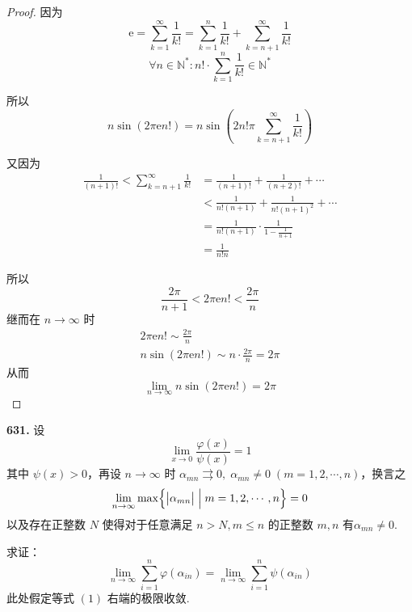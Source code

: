 \begin{proof}
    因为
    \[\mathrm{e} = \sum_{k=1}^{\infty} \frac{1}{k!} = \sum_{k=1}^{n} \frac{1}{k!} + \sum_{k=n+1}^{\infty} \frac{1}{k!}\]
    \[\forall n \in \mathbb{N}^*: n! \cdot \sum_{k=1}^{n} \frac{1}{k!} \in \mathbb{N}^*\]

    所以
    \[n \sin (2\pi \mathrm{e} n!) = n \sin \left(2n! \pi \sum_{k=n+1}^{\infty} \frac{1}{k!}\right)\]

    又因为
    \begin{align*}
        \frac{1}{(n+1)!} < \sum_{k=n+1}^{\infty} \frac{1}{k!} &= \frac{1}{(n+1)!} + \frac{1}{(n+2)!} + \cdots\\
        &< \frac{1}{n!(n+1)} + \frac{1}{n!(n+1)^2} + \cdots\\
        &= \frac{1}{n!(n+1)} \cdot \frac{1}{1-\frac{1}{n+1}}\\
        &= \frac{1}{n!n}
    \end{align*}

    所以
    \[\frac{2\pi}{n+1} < 2\pi \mathrm{e} n! < \frac{2\pi}{n}\]
    继而在 $n \rightarrow \infty$ 时
    \begin{gather*}
        2\pi \mathrm{e} n! \sim \frac{2\pi}{n}\\
        n \sin(2\pi \mathrm{e} n!) \sim n \cdot \frac{2\pi}{n} = 2\pi
    \end{gather*}
    从而
    \[\lim_{n \rightarrow \infty} n \sin(2\pi \mathrm{e} n!) = 2\pi\]
\end{proof}\vspace{9pt}

\textbf{631.} 设
\[\lim_{x \rightarrow 0} \frac{\varphi(x)}{\psi(x)} = 1\]
其中 $\psi(x) > 0$，再设 $n \rightarrow \infty$ 时 $\alpha_{mn} \rightrightarrows 0,\; \alpha_{mn} \neq 0 \;(m = 1,2, \cdots, n)$，换言之
\[\lim_{n \rightarrow \infty} \max\Bigl\{ \bigl| \alpha_{mn}\bigr| \Bigm| m = 1,2,\cdots, n\Bigr\} = 0\]
以及存在正整数 $N$ 使得对于任意满足 $n > N, m \leqslant n$ 的正整数 $m,n$ 有$\alpha_{mn} \neq 0$.

求证：
\[\lim_{n \rightarrow \infty} \sum_{i=1}^{n} \varphi(\alpha_{in}) = \lim_{n \rightarrow \infty} \sum_{i=1}^{n} \psi(\alpha_{in}) \tag{631.1}\]
此处假定等式 $(1)$ 右端的极限收敛.

